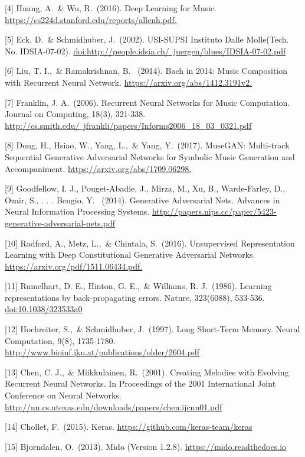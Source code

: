 \documentclass[final]{article}
\begin{document}
[4] Huang, A.\ \& Wu, R.\ (2016). Deep Learning for Music. \href{url}{https://cs224d.stanford.edu/reports/allenh.pdf.}

[5] Eck, D.\ \& Schmidhuber, J.\ (2002). USI-SUPSI Instituto Dalle Molle(Tech. No. IDSIA-07-02). \href{url}{doi:http://people.idsia.ch/~juergen/blues/IDSIA-07-02.pdf}

[6] Liu, T. I.,\ \& Ramakrishnan, B. \ (2014). Bach in 2014: Music Composition with Recurrent Neural Network. \href{url}{https://arxiv.org/abs/1412.3191v2.}

[7] Franklin, J. A.\ (2006). Recurrent Neural Networks for Music Computation. Journal on Computing, 18(3), 321-338. \href{url}{http://cs.smith.edu/~jfrankli/papers/Informs2006\_18\_03\_0321.pdf}

[8] Dong, H., Hsiao, W., Yang, L.,\ \& Yang, Y.\ (2017). MuseGAN: Multi-track Sequential Generative Adversarial Networks for Symbolic Music Generation and Accompaniment. \href{url}{https://arxiv.org/abs/1709.06298.}

[9] Goodfellow, I. J., Pouget-Abadie, J., Mirza, M., Xu, B., Warde-Farley, D., Ozair, S., . . . Bengio, Y. \ (2014). Generative Adversarial Nets. Advances in Neural Information Processing Systems.  \href{url}{http://papers.nips.cc/paper/5423-generative-adversarial-nets.pdf}

[10] Radford, A., Metz, L.,\ \& Chintala, S.\ (2016). Unsupervised Representation Learning with Deep Constitutional Generative Adversarial Networks. \href{url}{https://arxiv.org/pdf/1511.06434.pdf.}

[11] Rumelhart, D. E., Hinton, G. E.,\ \& Williams, R. J.\ (1986). Learning representations by back-propagating errors. Nature, 323(6088), 533-536.  \href{url}{doi:10.1038/323533a0}

[12] Hochreiter, S.,\ \& Schmidhuber, J.\ (1997). Long Short-Term Memory. Neural Computation, 9(8), 1735-1780. \href{url}{http://www.bioinf.jku.at/publications/older/2604.pdf}

[13] Chen, C. J.,\ \& Miikkulainen, R.\ (2001). Creating Melodies with Evolving Recurrent Neural Networks. In Proceedings of the 2001 International Joint Conference on Neural Networks. \href{url}{http://nn.cs.utexas.edu/downloads/papers/chen.ijcnn01.pdf}

[14] Chollet, F.\ (2015). Keras. \href{url}{https://github.com/keras-team/keras}

[15] Bjorndalen, O.\ (2013). Mido (Version 1.2.8). \href{url}{https://mido.readthedocs.io} 
\end{document}
